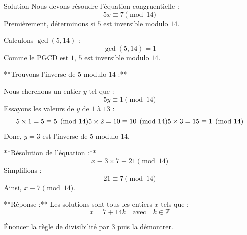 \documentclass[a4paper,12pt]{article}
\begin{document}
\begin{solutionbox}{Solution}
Nous devons résoudre l'équation congruentielle :
\[
5x \equiv 7 \pmod{14}
\]
Premièrement, déterminons si \( 5 \) est inversible modulo \( 14 \).

Calculons \( \gcd(5, 14) \) :
\[
\gcd(5, 14) = 1
\]
Comme le PGCD est \( 1 \), \( 5 \) est inversible modulo \( 14 \).

**Trouvons l’inverse de \( 5 \) modulo \( 14 \) :**

Nous cherchons un entier \( y \) tel que :
\[
5y \equiv 1 \pmod{14}
\]
Essayons les valeurs de \( y \) de \( 1 \) à \( 13 \) :
\[
5 \times 1 = 5 \equiv 5 \pmod{14} \\
5 \times 2 = 10 \equiv 10 \pmod{14} \\
5 \times 3 = 15 \equiv 1 \pmod{14}
\]
Donc, \( y = 3 \) est l'inverse de \( 5 \) modulo \( 14 \).

**Résolution de l'équation :**
\[
x \equiv 3 \times 7 \equiv 21 \pmod{14}
\]
Simplifions :
\[
21 \equiv 7 \pmod{14}
\]
Ainsi, \( x \equiv 7 \pmod{14} \).

**Réponse :**
Les solutions sont tous les entiers \( x \) tels que :
\[
x = 7 + 14k \quad \text{avec} \quad k \in \mathbb{Z}
\]
\end{solutionbox}

\begin{exercice}[title=Exercice 6 $\quad \star \star \quad$ { [Communiquer, Démontrer] }]
Énoncer la règle de divisibilité par \( 3 \) puis la démontrer.
\end{exercice}
\end{document}
